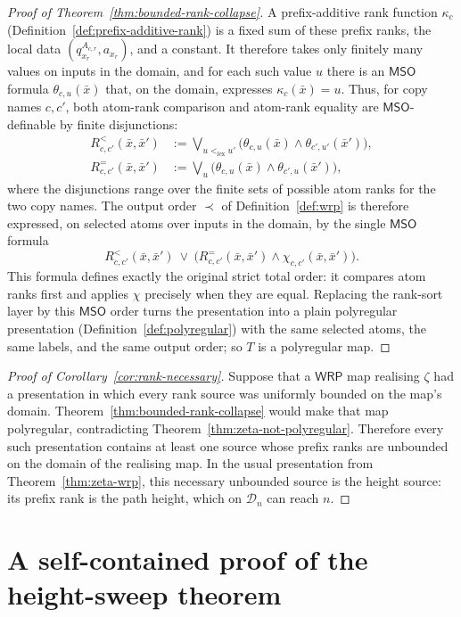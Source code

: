 \documentclass[11pt]{article}
\theoremstyle{definition}
\newcommand{\D}{\mathcal D}
\newcommand{\WRP}{\mathsf{WRP}}
\newcommand{\MSO}{\mathsf{MSO}}
\begin{document}
\begin{proof}[Proof of Theorem~\ref{thm:bounded-rank-collapse}]
A prefix-additive rank function $\kappa_c$
(Definition~\ref{def:prefix-additive-rank}) is a fixed sum of these prefix
ranks, the local data $(q^{A_{c,r}}_{x_r},a_{x_r})$, and a constant.  It
therefore takes only finitely many values on inputs in the domain, and for each
such value $u$ there is an $\MSO$ formula
$\theta_{c,u}(\bar x)$ that, on the domain, expresses
$\kappa_c(\bar x)=u$.  Thus, for copy names $c,c'$, both atom-rank comparison
and atom-rank equality are $\MSO$-definable by finite disjunctions:
\[
\begin{aligned}
 R^{<}_{c,c'}(\bar x,\bar x')
   &:=\bigvee_{u<_{\mathrm{lex}}u'}
      \bigl(\theta_{c,u}(\bar x)\land
             \theta_{c',u'}(\bar x')\bigr),\\
 R^{=}_{c,c'}(\bar x,\bar x')
   &:=\bigvee_u
      \bigl(\theta_{c,u}(\bar x)\land
             \theta_{c',u}(\bar x')\bigr),
\end{aligned}
\]
where the disjunctions range over the finite sets of possible atom ranks for
the two copy names.
The output order $\prec$ of Definition~\ref{def:wrp} is therefore expressed,
on selected atoms over inputs in the domain, by the single $\MSO$ formula
\[
   R^{<}_{c,c'}(\bar x,\bar x')
   \ \lor\
   \bigl(R^{=}_{c,c'}(\bar x,\bar x')\land
          \chi_{c,c'}(\bar x,\bar x')\bigr).
\]
This formula defines exactly the original strict total order: it compares
atom ranks first and applies $\chi$ precisely when they are equal.  Replacing the
rank-sort layer by this $\MSO$ order turns the presentation into a plain
polyregular presentation
(Definition~\ref{def:polyregular}) with the same selected atoms, the same
labels, and the same output order; so $T$ is a polyregular map.
\end{proof}

\begin{proof}[Proof of Corollary~\ref{cor:rank-necessary}]
Suppose that a $\WRP$ map realising $\zeta$ had a presentation in which every
rank source was uniformly bounded on the map's domain.
Theorem~\ref{thm:bounded-rank-collapse} would make that map polyregular,
contradicting Theorem~\ref{thm:zeta-not-polyregular}.  Therefore every such
presentation contains at least one source whose prefix ranks are unbounded on
the domain of the realising map.  In the usual presentation from
Theorem~\ref{thm:zeta-wrp}, this necessary unbounded source is the height
source: its prefix rank is the path height, which on $\D_n$ can reach $n$.
\end{proof}

\section{A self-contained proof of the height-sweep theorem}
\label{app:narayana-sweep-proof}
\end{document}
